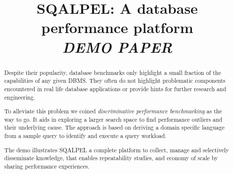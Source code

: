 \documentclass{cidr-2019}
\begin{document}
\title{SQALPEL: A database performance platform\\\emph{DEMO PAPER}}
\author{
}

\maketitle
\date{}

\begin{abstract}
Despite their popularity, database benchmarks only highlight a small
fraction of the capabilities of any given DBMS. They often do not
highlight problematic components encountered in real life database
applications or provide hints for further research and engineering.



To alleviate this problem we coined \textit{discriminative performance
  benchmarking} as the way to go. It aids in exploring a larger search
space to find performance outliers and their underlying cause. The
approach is based on deriving a domain specific language from a sample
query to identify and execute a query workload.

The demo illustrates {\sc SQALPEL} a complete platform to collect,
manage and selectively disseminate knowledge, that enables
repeatability studies, and economy of scale by sharing performance
experiences.

\end{abstract}
\end{document}

